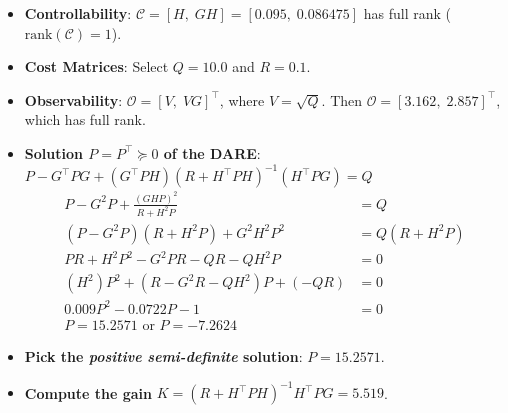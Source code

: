 \documentclass[
  letterpaper,
  DIV=11,
  numbers=noendperiod,
  oneside]{scrartcl}
\providecommand{\tightlist}{%
  \setlength{\itemsep}{0pt}\setlength{\parskip}{0pt}}
\begin{document}
\begin{itemize}
\tightlist
\item
  \textbf{Controllability}:
  \(\mathcal{C} = [H,\; GH] = [0.095,\; 0.086475]\) has full rank
  (\(\text{rank}(\mathcal{C})=1\)).
\item
  \textbf{Cost Matrices}: Select \(Q = 10.0\) and \(R = 0.1\).
\item
  \textbf{Observability}: \(\mathcal{O} = [V,\; VG]^\intercal\), where
  \(V = \sqrt{Q}\). Then \(\mathcal{O} = [3.162,\; 2.857]^\intercal\),
  which has full rank.
\item
  \textbf{Solution \(P=P^\intercal\succeq 0\) of the DARE}:
  \(P - G^\intercal P G + (G^\intercal P H)(R + H^\intercal P H)^{-1}(H^\intercal P G) = Q\)
  \[
  \begin{align*}
  P - G^2 P + \frac{(G H P)^2}{R + H^2 P} &= Q \\
  (P - G^2 P)(R + H^2 P) + G^2 H^2 P^2 &= Q (R + H^2 P) \\
  P R + H^2 P^2 - G^2 P R - Q R - Q H^2 P &= 0 \\ 
  (H^2) P^2 + (R - G^2 R - Q H^2) P + (- Q R) &= 0 \\ 
  0.009 P^2 -0.0722 P - 1 &= 0 \\ 
  P = 15.2571 \text{ or } P = -7.2624
  \end{align*}
  \]
\item
  \textbf{Pick the \emph{positive semi-definite} solution}:
  \(P = 15.2571\).
\item
  \textbf{Compute the gain}
  \(K = (R + H^\intercal P H)^{-1} H^\intercal P G = 5.519\).
\end{itemize}
\end{document}
